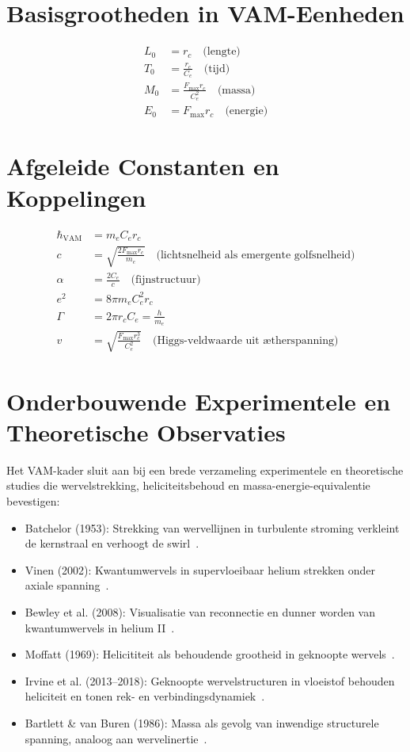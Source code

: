 \documentclass{article}
\begin{document}
    \section*{Basisgrootheden in VAM-Eenheden}
    \begin{align*}
        L_0 &= r_c \quad \text{(lengte)} \\
        T_0 &= \frac{r_c}{C_e} \quad \text{(tijd)} \\
        M_0 &= \frac{F_{\text{max}} r_c}{C_e^2} \quad \text{(massa)} \\
        E_0 &= F_{\text{max}} r_c \quad \text{(energie)}
    \end{align*}

    \section*{Afgeleide Constanten en Koppelingen}
    \begin{align*}
        \hbar_{\text{VAM}} &= m_e C_e r_c \\
        c &= \sqrt{\frac{2 F_{\text{max}} r_c}{m_e}} \quad \text{(lichtsnelheid als emergente golfsnelheid)} \\
        \alpha &= \frac{2 C_e}{c} \quad \text{(fijnstructuur)} \\
        e^2 &= 8\pi m_e C_e^2 r_c \\
        \Gamma &= 2\pi r_c C_e = \frac{h}{m_e} \\
        v &= \sqrt{\frac{F_{\text{max}} r_c^3}{C_e^2}} \quad \text{(Higgs-veldwaarde uit \ae therspanning)}
    \end{align*}

    \section*{Onderbouwende Experimentele en Theoretische Observaties}
    Het VAM-kader sluit aan bij een brede verzameling experimentele en theoretische studies die wervelstrekking, heliciteitsbehoud en massa-energie-equivalentie bevestigen:

    \begin{itemize}
        \item Batchelor (1953): Strekking van wervellijnen in turbulente stroming verkleint de kernstraal en verhoogt de swirl~\cite{batchelor1953}.
        \item Vinen (2002): Kwantumwervels in supervloeibaar helium strekken onder axiale spanning~\cite{vinen2002}.
        \item Bewley et al. (2008): Visualisatie van reconnectie en dunner worden van kwantumwervels in helium II~\cite{bewley2008}.
        \item Moffatt (1969): Helicititeit als behoudende grootheid in geknoopte wervels~\cite{moffatt1969}.
        \item Irvine et al. (2013–2018): Geknoopte wervelstructuren in vloeistof behouden heliciteit en tonen rek- en verbindingsdynamiek~\cite{kleckner2013,scheeler2014}.
        \item Bartlett \& van Buren (1986): Massa als gevolg van inwendige structurele spanning, analoog aan wervelinertie~\cite{bartlett1986}.
    \end{itemize}
\end{document}
